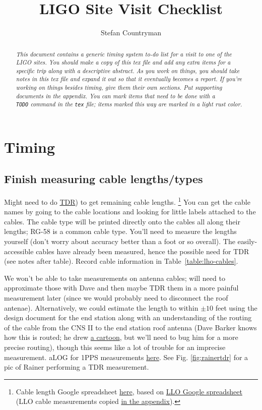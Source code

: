\documentclass{article}
\author{Stefan Countryman}
\title{LIGO Site Visit Checklist}
\newcommand*{\TODO}{\textcolor{todo}}
\begin{document}
\maketitle

\begin{abstract}
\emph{This document contains a generic timing system to-do list for a visit to one of the LIGO sites. You should make a copy of this tex file and add any extra items for a specific trip along with a descriptive abstract. As you work on things, you should take notes in this tex file and expand it out so that it eventually becomes a report. If you're working on things besides timing, give them their own sections. Put supporting documents in the appendix. You can mark items that need to be done with a \texttt{\\TODO} command in the \texttt{tex} file; items marked this way are \TODO{marked in a light rust color}.}
\end{abstract}

\section{Timing}

\TODO{
\subsection{Finish measuring cable lengths/types}
}
Might need to do 
\href{https://en.wikipedia.org/wiki/Time-domain_reflectometer}{TDR})
to get remaining cable lengths.
\footnote{
    Cable length Google spreadsheet \href{https://docs.google.com/spreadsheets/d/1cjpBtpd4oPAfjNjBhE3RXxSx3ma3oopqLLZFMjEjc0w/edit\#gid=0}{here}, based on \href{https://docs.google.com/spreadsheets/d/1AfZ9m7Qetefmtr-PnHNARC14OWaPfn0z5c9GOvcojyA/edit\#gid=0}{LLO Google spreadsheet} (LLO cable measurements copied \hyperref[sec:llocables]{in the appendix}).
}
You can get the cable names by going to the cable locations and looking for little labels attached to the cables. The cable type will be printed directly onto the cables all along their lengths; RG-58 is a common cable type. You'll need to measure the lengths yourself (don't worry about accuracy better than a foot or so overall). The easily-accessible cables have already been measured, hence the possible need for TDR (see notes after table).
Record cable information in Table~\ref{table:lho-cables}.

We won't be able to take measurements on antenna cables; will need to approximate those with Dave and then maybe TDR them in a more painful measurement later (since we would probably need to disconnect the roof antenae). Alternatively, we could estimate the length to within $\pm10$ feet using the design document for the end station along with an understanding of the routing of the cable from the CNS II to the end station roof antenna (Dave Barker knows how this is routed; he drew 
\hyperref[fig:routing]{a cartoon}, but we'll need to bug him for a more precise routing), though this seems like a lot of trouble for an imprecise measurement. aLOG for 1PPS measurements 
\href{https://alog.ligo-wa.caltech.edu/aLOG/index.php?callRep=43185}{here}. See Fig. \ref{fig:rainertdr} for a pic of Rainer performing a TDR measurement.
\end{document}
